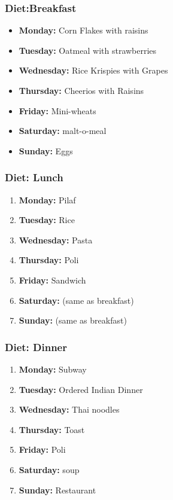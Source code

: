 \begin{frame} 
\frametitle{Diet:Breakfast} 
\begin{itemize} 
\item \textbf{Monday:}  Corn Flakes with raisins
\item \textbf{Tuesday:}   Oatmeal with strawberries
\item \textbf{Wednesday:} Rice Krispies with Grapes
\item \textbf{Thursday:} Cheerios with Raisins
\item \textbf{Friday:}   Mini-wheats
\item \textbf{Saturday:} malt-o-meal 
\item \textbf{Sunday:}  Eggs
\end{itemize} 

\end{frame} 


\begin{frame} 
\frametitle{Diet: Lunch} 
\begin{enumerate} 
\item \textbf{Monday:} Pilaf 
\item \textbf{Tuesday:} Rice 
\item \textbf{Wednesday:} Pasta  
\item \textbf{Thursday:} Poli 
\item \textbf{Friday:} Sandwich 
\item \textbf{Saturday:} (same as breakfast)
\item \textbf{Sunday:} (same as breakfast)
\end{enumerate} 
\end{frame}

\begin{frame} 
\frametitle{Diet: Dinner} 
\begin{enumerate} 
\item \textbf{Monday:} Subway 
\item \textbf{Tuesday:} Ordered Indian Dinner 
\item \textbf{Wednesday:} Thai noodles
\item \textbf{Thursday:} Toast 
\item \textbf{Friday:}  Poli 
\item \textbf{Saturday:} soup
\item \textbf{Sunday:}   Restaurant 
\end{enumerate} 
\end{frame}
